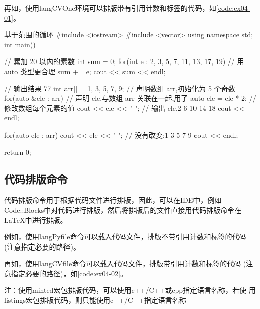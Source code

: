 \documentclass[
  ]{nwafuprojrep}
\begin{document}
再如，使用langCVOne环境可以排版带有引用计数和标签的代码，如\autoref{code:ex04-01}。
\begin{langCVOne}[C++][code:ex04-01][C++]{基于范围的循环}
#include <iostream>
#include <vector>
using namespace std;
int main()
{
    // 累加 20 以内的素数
    int sum = 0;
    for(int e : {2, 3, 5, 7, 11, 13, 17, 19}) // 用 auto 类型更合理
    {
        sum += e;
    }
    cout << sum << endl;

    // 输出结果 77
    int arr[] = {1, 3, 5, 7, 9};
    // 声明数组 arr,初始化为 5 个奇数
    for(auto &ele : arr)
    {
        // 声明 ele,与数组 arr 关联在一起,用了 auto
        ele = ele * 2;
        // 修改数组每个元素的值
        cout << ele << " ";
        // 输出 ele,2 6 10 14 18
    }
    cout << endl;

    for(auto ele : arr)
    {
        cout << ele << " ";
    }
    // 没有改变:1 3 5 7 9
    cout << endl;

    return 0;
}  
\end{langCVOne}

\subsection{代码排版命令}
代码排版命令用于根据代码文件进行排版，因此，可以在IDE中，例如
Code::Blocks中对代码进行排版，然后将排版后的文件直接用代码排版命令在
\LaTeX{}中进行排版。

例如，使用langPyfile命令可以载入代码文件，排版不带引用计数和标签的代码
(注意指定必要的路径)。


再如，使用langCVfile命令可以载入代码文件，排版带引用计数和标签的代码
(注意指定必要的路径)，如\autoref{code:ex04-02}。


注：使用minted宏包排版代码，可以使用c++/C++或cpp指定语言名称，若使
用listings宏包排版代码，则只能使用c++/C++指定语言名称

\newpage
\printbibliography[heading=bibliography,title=参考文献]
\end{document}
